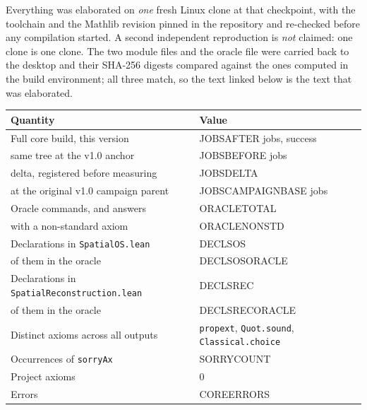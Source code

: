 \documentclass[11pt]{article}
\theoremstyle{definition}
\begin{document}
Everything was elaborated on \emph{one} fresh Linux clone at that checkpoint,
with the toolchain and the Mathlib revision pinned in the repository and
re-checked before any compilation started.  A second independent reproduction is
\emph{not} claimed: one clone is one clone.  The two module files and the oracle
file were carried back to the desktop and their SHA-256 digests compared against
the ones computed in the build environment; all three match, so the text linked
below is the text that was elaborated.

\begin{center}
\begin{tabular}{ll}
\toprule
Quantity & Value \\
\midrule
Full core build, this version & JOBSAFTER jobs, success \\ %
\quad same tree at the v1.0 anchor & JOBSBEFORE jobs \\ %
\quad delta, registered before measuring & JOBSDELTA \\ %
\quad at the original v1.0 campaign parent & JOBSCAMPAIGNBASE jobs \\ %
Oracle commands, and answers & ORACLETOTAL \\ %
\quad with a non-standard axiom & ORACLENONSTD \\ %
Declarations in \texttt{SpatialOS.lean} & DECLSOS \\ %
\quad of them in the oracle & DECLSOSORACLE \\ %
Declarations in \texttt{SpatialReconstruction.lean} & DECLSREC \\ %
\quad of them in the oracle & DECLSRECORACLE \\ %
Distinct axioms across all outputs & \texttt{propext}, \texttt{Quot.sound},
  \texttt{Classical.choice} \\
Occurrences of \texttt{sorryAx} & SORRYCOUNT \\ %
Project axioms & 0 \\
Errors & COREERRORS \\ %
\bottomrule
\end{tabular}
\end{center}
\end{document}
